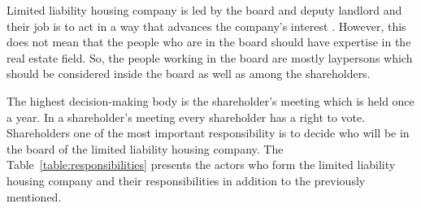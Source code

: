 Limited liability housing company is led by the board and deputy landlord and their job is to act in a way that advances the company's interest \parencite{LLHA:2}. However, this does not mean that the people who are in the board should have expertise in the real estate field. So, the people working in the board are mostly laypersons which should be considered inside the board as well as among the shareholders. \parencite{Hallintotapa:2017}

The highest decision-making body is the shareholder's meeting which is held once a year. In a shareholder's meeting every shareholder has a right to vote. Shareholders one of the most important responsibility is to decide who will be in the board of the limited liability housing company. The Table~\ref{table:responsibilities} presents the actors who form the limited liability housing company and their responsibilities in addition to the previously mentioned. \parencite{RantanenViiala:2015} 

